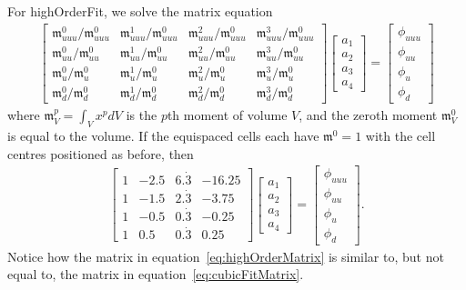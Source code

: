 \documentclass{article}
\newcommand{\moment}{\mathfrak{m}}
\begin{document}
For highOrderFit, we solve the matrix equation
\begin{align}
	\begin{bmatrix}
		\moment_{uuu}^0/\moment_{uuu}^0 & \moment_{uuu}^1/\moment_{uuu}^0 & \moment_{uuu}^2/\moment_{uuu}^0 & \moment_{uuu}^3/\moment_{uuu}^0 \\
		\moment_{uu}^0/\moment_{uu}^0 & \moment_{uu}^1/\moment_{uu}^0 & \moment_{uu}^2/\moment_{uu}^0 & \moment_{uu}^3/\moment_{uu}^0 \\
		\moment_u^0/\moment_u^0 & \moment_u^1/\moment_u^0 & \moment_u^2/\moment_u^0 & \moment_u^3/\moment_u^0 \\
		\moment_d^0/\moment_d^0 & \moment_d^1/\moment_d^0 & \moment_d^2/\moment_d^0 & \moment_d^3/\moment_d^0
	\end{bmatrix}
	\begin{bmatrix}
		a_1 \\
		a_2 \\
		a_3 \\
		a_4
	\end{bmatrix}
	=
	\begin{bmatrix}
		\phi_{uuu} \\
		\phi_{uu} \\
		\phi_u \\
		\phi_d
	\end{bmatrix}
\end{align}
where $\moment_V^p = \int_V x^p dV$ is the $p$th moment of volume $V$, and the zeroth moment $\moment_V^0$ is equal to the volume.
If the equispaced cells each have $\moment^0 = 1$ with the cell centres positioned as before, then
\begin{align}
	\begin{bmatrix}
		1 & -2.5 & 6.\dot{3} & -16.25 \\
		1 & -1.5 & 2.\dot{3} & -3.75 \\
		1 & -0.5 & 0.\dot{3} & -0.25 \\
		1 &  0.5 & 0.\dot{3} & 0.25
	\end{bmatrix}
	\begin{bmatrix}
		a_1 \\
		a_2 \\
		a_3 \\
		a_4
	\end{bmatrix}
	=
	\begin{bmatrix}
		\phi_{uuu} \\
		\phi_{uu} \\
		\phi_u \\
		\phi_d
	\end{bmatrix}
	\text{.}
	\label{eq:highOrderMatrix}
\end{align}
Notice how the matrix in equation~\eqref{eq:highOrderMatrix} is similar to, but not equal to, the matrix in equation~\eqref{eq:cubicFitMatrix}.
\end{document}

